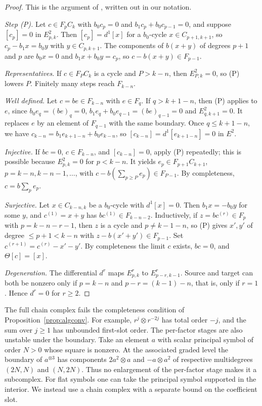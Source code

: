 \documentclass[11pt,oneside,reqno]{article}
\theoremstyle{plain}
\theoremstyle{definition}
\theoremstyle{remark}
\begin{document}
\begin{proof}
This is the argument of \cite[Ch.~``Hochschild homology'', convergence proposition]{MelroseMicro},
written out in our notation.

\emph{Step (P).} Let \(c\in F_pC_k\) with \(b_0c_p=0\) and
\(b_1c_p+b_0c_{p-1}=0\), and suppose \([c_p]=0\) in \(E^2_{p,k}\). Then
\([c_p]=d^1[x]\) for a \(b_0\)-cycle \(x\in C_{p+1,k+1}\), so
\(c_p-b_1x=b_0y\) with \(y\in C_{p,k+1}\). The components of \(b(x+y)\) of
degrees \(p+1\) and \(p\) are \(b_0x=0\) and \(b_1x+b_0y=c_p\), so
\(c-b(x+y)\in F_{p-1}\).

\emph{Representatives.} If \(c\in F_PC_k\) is a cycle and \(P>k-n\), then
\(E^2_{P,k}=0\), so (P) lowers \(P\). Finitely many steps reach
\(F_{k-n}\).

\emph{Well defined.} Let \(c=be\in F_{k-n}\) with \(e\in F_q\). If
\(q>k+1-n\), then (P) applies to \(e\), since
\(b_0e_q=(be)_q=0\), \(b_1e_q+b_0e_{q-1}=(be)_{q-1}=0\) and
\(E^2_{q,k+1}=0\). It replaces \(e\) by an element of \(F_{q-1}\) with the
same boundary. Once \(q\leq k+1-n\), we have
\(c_{k-n}=b_1e_{k+1-n}+b_0e_{k-n}\), so \([c_{k-n}]=d^1[e_{k+1-n}]=0\) in
\(E^2\).

\emph{Injective.} If \(bc=0\), \(c\in F_{k-n}\), and \([c_{k-n}]=0\), apply
(P) repeatedly; this is possible because \(E^2_{p,k}=0\) for \(p<k-n\).
It yields \(e_p\in F_{p+1}C_{k+1}\), \(p=k-n,k-n-1,\dots\), with
\(c-b(\sum_{p\geq P}e_p)\in F_{P-1}\). By completeness, \(c=b\sum_pe_p\).

\emph{Surjective.} Let \(x\in C_{k-n,k}\) be a \(b_0\)-cycle with
\(d^1[x]=0\). Then \(b_1x=-b_0y\) for some \(y\), and \(c^{(1)}=x+y\) has
\(bc^{(1)}\in F_{k-n-2}\). Inductively, if \(z=bc^{(r)}\in F_p\) with
\(p=k-n-r-1\), then \(z\) is a cycle and \(p\neq k-1-n\), so (P) gives
\(x',y'\) of degree \(\leq p+1<k-n\) with \(z-b(x'+y')\in F_{p-1}\). Set
\(c^{(r+1)}=c^{(r)}-x'-y'\). By completeness the limit \(c\) exists,
\(bc=0\), and \(\Theta[c]=[x]\).

\emph{Degeneration.} The differential \(d^r\) maps \(E^r_{p,k}\) to
\(E^r_{p-r,k-1}\). Source and target can both be nonzero only if
\(p=k-n\) and \(p-r=(k-1)-n\), that is, only if \(r=1\). Hence \(d^r=0\) for
\(r\geq2\).
\end{proof}

The full chain complex fails the completeness condition of
Proposition~\ref{prop:algconv}. For example,
\(r^j\otimes r^{-2j}\) has total order \(-j\), and the sum over
\(j\geq1\) has unbounded first-slot order. The per-factor stages are
also unstable under the boundary. Take an element
\(a\) with scalar principal symbol of order \(N>0\) whose square is
nonzero. At the associated graded level the boundary of \(a^{\otimes3}\)
has components \(2a^2\otimes a\) and \(-a\otimes a^2\) of respective
multidegrees \((2N,N)\) and \((N,2N)\). Thus no enlargement of the
per-factor stage makes it a subcomplex. For flat symbols one can take
the principal symbol supported in the interior. We instead use a chain
complex with a separate bound on the coefficient slot.
\end{document}
